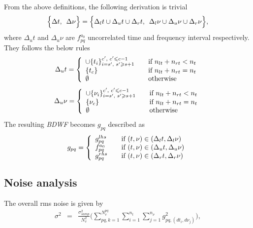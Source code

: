 \documentclass[useAMS,usenatbib]{mn2e}
\begin{document}
From the above definitions, the following derivation is trivial 
\begin{equation*}
 \Big\{\Delta t,\hspace{0.17cm}\Delta \nu \Big\}=\Big\{\Delta_l t \cup \Delta_u t \cup \Delta_r t, \hspace{0.17cm}\Delta_l \nu \cup 
\Delta_u \nu \cup \Delta_r \nu \Big\},
\end{equation*}
where $\Delta_u t$ and $\Delta_u \nu$ are $f_{pq}^{a_0}$ uncorrelated time  and frequency interval respectively. They follows the below 
rules 
\begin{eqnarray*}
 \Delta_u t= \left\{ 
  \begin{array}{l l}
     \cup\{t_i\}_{i=s',\hspace{0.1cm} s' \geq s+1}^{c', \hspace{0.1cm}c'\leq c-1} & \quad \text{if $n_{lt}+n_{rt}< n_t$}\\
      \{t_c\}& \quad \text{if $n_{lt}+n_{rt} = n_t$}\\
       \emptyset  & \quad \text{otherwise}
  \end{array} \right.
\end{eqnarray*}
\begin{eqnarray*}
 \Delta_u \nu= \left\{ 
  \begin{array}{l l}
     \cup\{\nu_i\}_{i=s',\hspace{0.1cm} s'\geq s+1}^{c', \hspace{0.1cm}c'\leq c-1} & \quad \text{if $n_{lt}+n_{rt} < n_t$}\\
      \{\nu_c\}& \quad \text{if $n_{lt}+n_{rt} = n_t$}\\
       \emptyset  & \quad \text{otherwise}
  \end{array} \right.
\end{eqnarray*}
The resulting \textit{BDWF} becomes $g_{pq}$ described as
\begin{eqnarray*}
g_{pq} = \left\{ 
  \begin{array}{l l}
    g^{lhs}_{pq} & \quad \text{if $(t,\nu) \in (\Delta_l t, \Delta_l \nu)$}\\
    f^{a_0}_{pq} & \quad \text{if $(t,\nu) \in (\Delta_u t, \Delta_u \nu)$}\\
    g^{rhs}_{pq}& \quad \text{if $(t,\nu) \in (\Delta_r t, \Delta_r \nu)$}
  \end{array} \right.
\end{eqnarray*}
\subsection{Noise analysis}
The  overall rms noise is given by
\begin{eqnarray*}
\sigma^2	&=& 
\frac{\sigma^{2}_{samp} }{N_{v}^{2}}\Big(\sum_{pq,k=1}^{N_{v}^{pq}}\sum_{i=1}^{n_t}\sum_{j=1}^{n_{\nu}}g_{pq,(dt_i,d\nu_j)}^{2}\Big) 
,\label{Equ:OBDWnoise}
\end{eqnarray*}
\end{document}
